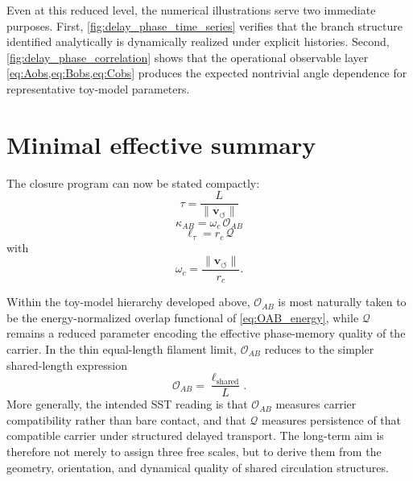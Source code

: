 \documentclass[11pt]{article}
\newcommand{\vnorm}{\lVert \mathbf{v}_{\!\boldsymbol{\circlearrowleft}}\rVert}
\newcommand{\rc}{r_c}
\begin{document}
        Even at this reduced level, the numerical illustrations serve two immediate purposes. First, \cref{fig:delay_phase_time_series} verifies that the branch structure identified analytically is dynamically realized under explicit histories. Second, \cref{fig:delay_phase_correlation} shows that the operational observable layer \cref{eq:Aobs,eq:Bobs,eq:Cobs} produces the expected nontrivial angle dependence for representative toy-model parameters.

    
    \section{Minimal effective summary}
        
        The closure program can now be stated compactly:
        \begin{equation}
            \boxed{
                \tau=\frac{L}{\vnorm}
            }
            \label{eq:summary_tau}
        \end{equation}
        \begin{equation}
            \boxed{
                \kappa_{AB}=\omega_c\,\mathcal{O}_{AB}
            }
            \label{eq:summary_kappa}
        \end{equation}
        \begin{equation}
            \boxed{
                \ell_\tau=\rc\,\mathcal{Q}
            }
            \label{eq:summary_l}
        \end{equation}
        with
        \begin{equation}
            \omega_c=\frac{\vnorm}{\rc}.
            \label{eq:summary_omega}
        \end{equation}

        Within the toy-model hierarchy developed above, \(\mathcal{O}_{AB}\) is most naturally taken to be the energy-normalized overlap functional of \cref{eq:OAB_energy}, while \(\mathcal{Q}\) remains a reduced parameter encoding the effective phase-memory quality of the carrier. In the thin equal-length filament limit, \(\mathcal{O}_{AB}\) reduces to the simpler shared-length expression
        \[
            \mathcal{O}_{AB}=\frac{\ell_{\mathrm{shared}}}{L}.
        \]
        More generally, the intended SST reading is that \(\mathcal{O}_{AB}\) measures carrier compatibility rather than bare contact, and that \(\mathcal{Q}\) measures persistence of that compatible carrier under structured delayed transport. The long-term aim is therefore not merely to assign three free scales, but to derive them from the geometry, orientation, and dynamical quality of shared circulation structures.
    
\end{document}
